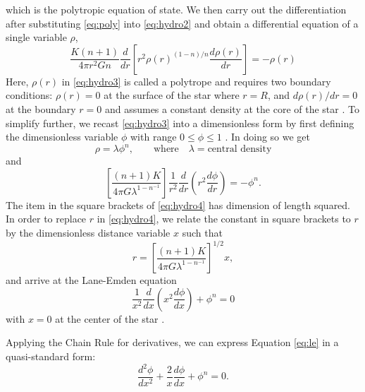 \documentclass[12pt, manuscript]{article}
\begin{document}
        which is the polytropic equation of state. We then carry out the differentiation after substituting \eqref{eq:poly} into \eqref{eq:hydro2} and obtain a differential equation of a single variable $\rho$,
        \begin{equation}\label{eq:hydro3}
            \frac{K(n+1)}{4\pi r^2Gn}\frac{d}{dr}\left[r^2\rho(r)^{(1-n)/n}\frac{d\rho(r)}{dr}\right] = -\rho(r)
        \end{equation}
        Here, $\rho(r)$ in \eqref{eq:hydro3} is called a polytrope and requires two boundary conditions: $\rho(r) = 0$ at the surface of the star where $r = R$, and $d\rho(r)/dr = 0$ at the boundary $r = 0$ and assumes a constant density at the core of the star \cite{dina}. To simplify further, we recast \eqref{eq:hydro3} into a dimensionless form by first defining the dimensionless variable $\phi$ with range $0 \leq \phi \leq 1$ \cite{lea} \cite{dina}. In doing so we get
        \begin{equation}\label{eq:theta} 
            \rho = \lambda\phi^n, \qquad \text{where} \quad \lambda = \text{central density}
        \end{equation}
         and
        \begin{equation}\label{eq:hydro4}
            \left[\frac{(n+1)K}{4\pi G\lambda^{1-n^{-1}}}\right]\frac{1}{r^2}\frac{d}{dr}\left(r^2\frac{d\phi}{dr}\right) = -\phi^n.
        \end{equation}
        The item in the square brackets of \eqref{eq:hydro4} has dimension of length squared. In order to replace $r$ in \eqref{eq:hydro4}, we relate the constant in square brackets to $r$ by the dimensionless distance variable $x$ such that
        \begin{equation}\label{eq:x}
            r = \left[\frac{(n+1)K}{4\pi G\lambda^{1-n^{-1}}}\right]^{1/2}x,
        \end{equation}
        and arrive at the Lane-Emden equation 
        \begin{equation}\label{eq:le}
            \frac{1}{x^2}\frac{d}{dx}\left(x^2\frac{d\phi}{dx}\right) +\phi^n = 0
        \end{equation}
        with $x = 0$ at the center of the star \cite{lea}.

\noindent Applying the Chain Rule for derivatives, we can express Equation \eqref{eq:le} in a quasi-standard form:
\begin{equation}\label{eq:lesf}
\frac{d^2\phi}{dx^2} + \frac{2}{x}\frac{d\phi}{dx} + \phi^n = 0.
\end{equation}
\end{document}
